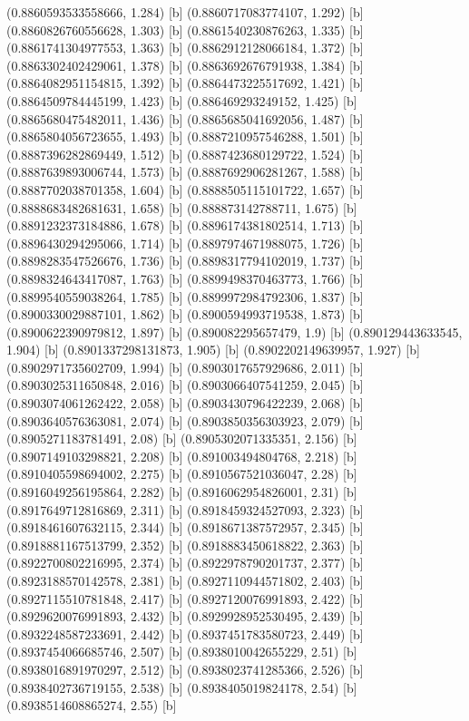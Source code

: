 {{{(0.8860593533558666, 1.284) [b] 
(0.8860717083774107, 1.292) [b] 
(0.8860826760556628, 1.303) [b] 
(0.8861540230876263, 1.335) [b] 
(0.8861741304977553, 1.363) [b] 
(0.8862912128066184, 1.372) [b] 
(0.8863302402429061, 1.378) [b] 
(0.8863692676791938, 1.384) [b] 
(0.8864082951154815, 1.392) [b] 
(0.8864473225517692, 1.421) [b] 
(0.8864509784445199, 1.423) [b] 
(0.886469293249152, 1.425) [b] 
(0.8865680475482011, 1.436) [b] 
(0.8865685041692056, 1.487) [b] 
(0.8865804056723655, 1.493) [b] 
(0.8887210957546288, 1.501) [b] 
(0.8887396282869449, 1.512) [b] 
(0.8887423680129722, 1.524) [b] 
(0.8887639893006744, 1.573) [b] 
(0.8887692906281267, 1.588) [b] 
(0.8887702038701358, 1.604) [b] 
(0.8888505115101722, 1.657) [b] 
(0.8888683482681631, 1.658) [b] 
(0.888873142788711, 1.675) [b] 
(0.8891232373184886, 1.678) [b] 
(0.8896174381802514, 1.713) [b] 
(0.8896430294295066, 1.714) [b] 
(0.8897974671988075, 1.726) [b] 
(0.8898283547526676, 1.736) [b] 
(0.8898317794102019, 1.737) [b] 
(0.8898324643417087, 1.763) [b] 
(0.8899498370463773, 1.766) [b] 
(0.8899540559038264, 1.785) [b] 
(0.8899972984792306, 1.837) [b] 
(0.8900330029887101, 1.862) [b] 
(0.8900594993719538, 1.873) [b] 
(0.8900622390979812, 1.897) [b] 
(0.890082295657479, 1.9) [b] 
(0.890129443633545, 1.904) [b] 
(0.8901337298131873, 1.905) [b] 
(0.8902202149639957, 1.927) [b] 
(0.8902971735602709, 1.994) [b] 
(0.8903017657929686, 2.011) [b] 
(0.8903025311650848, 2.016) [b] 
(0.8903066407541259, 2.045) [b] 
(0.8903074061262422, 2.058) [b] 
(0.8903430796422239, 2.068) [b] 
(0.8903640576363081, 2.074) [b] 
(0.8903850356303923, 2.079) [b] 
(0.8905271183781491, 2.08) [b] 
(0.8905302071335351, 2.156) [b] 
(0.8907149103298821, 2.208) [b] 
(0.891003494804768, 2.218) [b] 
(0.8910405598694002, 2.275) [b] 
(0.8910567521036047, 2.28) [b] 
(0.8916049256195864, 2.282) [b] 
(0.8916062954826001, 2.31) [b] 
(0.8917649712816869, 2.311) [b] 
(0.8918459324527093, 2.323) [b] 
(0.8918461607632115, 2.344) [b] 
(0.8918671387572957, 2.345) [b] 
(0.8918881167513799, 2.352) [b] 
(0.8918883450618822, 2.363) [b] 
(0.8922700802216995, 2.374) [b] 
(0.8922978790201737, 2.377) [b] 
(0.8923188570142578, 2.381) [b] 
(0.8927110944571802, 2.403) [b] 
(0.8927115510781848, 2.417) [b] 
(0.8927120076991893, 2.422) [b] 
(0.8929620076991893, 2.432) [b] 
(0.8929928952530495, 2.439) [b] 
(0.8932248587233691, 2.442) [b] 
(0.8937451783580723, 2.449) [b] 
(0.8937454066685746, 2.507) [b] 
(0.8938010042655229, 2.51) [b] 
(0.8938016891970297, 2.512) [b] 
(0.8938023741285366, 2.526) [b] 
(0.8938402736719155, 2.538) [b] 
(0.8938405019824178, 2.54) [b] 
(0.8938514608865274, 2.55) [b] 
}}}
